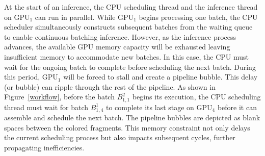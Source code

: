 At the start of an inference, the CPU scheduling thread and the inference thread on GPU$_1$ can run in parallel. 
While GPU$_1$ begins processing one batch, the CPU scheduler simultaneously constructs subsequent batches from the waiting queue to enable continuous batching inference. 
However, as the inference process advances, the available GPU memory capacity will be exhausted leaving insufficient memory to accommodate new batches.
In this case, the CPU must wait for the ongoing batch to complete before scheduling the next batch.
During this period, GPU$_1$ will be forced to stall and create a pipeline bubble.
This delay (or bubble) can ripple through the rest of the pipeline.  
As shown in Figure~\ref{workflow}, before the batch $B_{1,1}^2$ begins its execution, the CPU scheduling thread must wait for batch $B_{1,4}^1$ to complete its last stage on $\text{GPU}_{4}$ before it can assemble and schedule the next batch.
The pipeline bubbles are depicted as blank spaces between the colored fragments.
This memory constraint not only delays the current scheduling process but also impacts subsequent cycles, further propagating inefficiencies.

